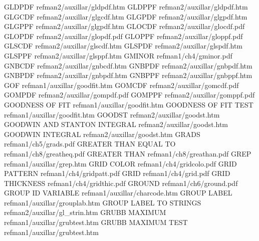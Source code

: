 GLDPDF                                  refman2/auxillar/gldpdf.htm
GLDPPF                                  refman2/auxillar/gldpdf.htm
GLGCDF                                  refman2/auxillar/glgcdf.htm
GLGPDF                                  refman2/auxillar/glgpdf.htm
GLGPPF                                  refman2/auxillar/glgpdf.htm
GLOCDF                                  refman2/auxillar/glocdf.pdf
GLOPDF                                  refman2/auxillar/glopdf.pdf
GLOPPF                                  refman2/auxillar/gloppf.pdf
GLSCDF                                  refman2/auxillar/glscdf.htm
GLSPDF                                  refman2/auxillar/glspdf.htm
GLSPPF                                  refman2/auxillar/glsppf.htm
GMINOR                                  refman1/ch4/gminor.pdf
GNBCDF                                  refman2/auxillar/gnbcdf.htm
GNBPDF                                  refman2/auxillar/gnbpdf.htm
GNBPDF                                  refman2/auxillar/gnbpdf.htm
GNBPPF                                  refman2/auxillar/gnbppf.htm
GOF                                     refman1/auxillar/goodfit.htm
GOMCDF                                  refman2/auxillar/gomcdf.pdf
GOMPDF                                  refman2/auxillar/gompdf.pdf
GOMPPF                                  refman2/auxillar/gomppf.pdf
GOODNESS OF FIT                         refman1/auxillar/goodfit.htm
GOODNESS OF FIT TEST                    refman1/auxillar/goodfit.htm
GOODST                                  refman2/auxillar/goodst.htm
GOODWIN AND STANTON INTEGRAL            refman2/auxillar/goodst.htm
GOODWIN INTEGRAL                        refman2/auxillar/goodst.htm
GRADS                                   refman1/ch5/grads.pdf
GREATER THAN EQUAL TO                   refman1/ch8/greatheq.pdf
GREATER THAN                            refman1/ch8/greathan.pdf
GREP                                    refman1/auxillar/grep.htm
GRID COLOR                              refman1/ch4/gridcolo.pdf
GRID PATTERN                            refman1/ch4/gridpatt.pdf
GRID                                    refman1/ch4/grid.pdf
GRID THICKNESS                          refman1/ch4/gridthic.pdf
GROUND                                  refman1/ch6/ground.pdf
GROUP ID VARIABLE                       refman1/auxillar/charcode.htm
GROUP LABEL                             refman1/auxillar/grouplab.htm
GROUP LABEL TO STRINGS                  refman2/auxillar/gl_strin.htm
GRUBB MAXIMUM                           refman1/auxillar/grubtest.htm
GRUBB MAXIMUM TEST                      refman1/auxillar/grubtest.htm
